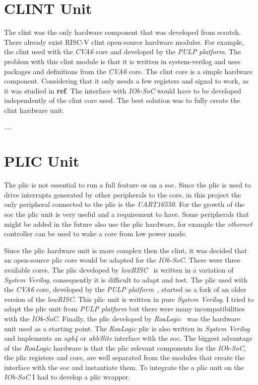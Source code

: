 \section{CLINT Unit}
The \acrshort{clint} was the only hardware component that was developed from scratch. There already exist RISC-V \acrfull{clint} open-source hardware modules. For example, the \acrshort{clint} used with the \textit{CVA6} core and developed by the \textit{PULP platform}. The problem with this \acrshort{clint} module is that it is written in system-verilog and uses packages and definitions from the \textit{CVA6} core. The \acrshort{clint} core is a simple hardware component. Considering that it only needs a few registers and signal to work, as it was studied in \textbf{ref}. The interface with \textit{IOb-SoC} would have to be developed independently of the \acrshort{clint} core used. The best solution was to fully create the \acrshort{clint} hardware unit.

....

\section{PLIC Unit}
The \acrshort{plic} is not essential to run a full feature \acrfull{os} on a \acrfull{soc}. Since the \acrshort{plic} is used to drive interrupts generated by other peripherals to the core, in this project the only peripheral connected to the \acrshort{plic} is the \textit{UART16550}. For the growth of the \acrshort{soc} the \acrshort{plic} unit is very useful and a requirement to have. Some peripherals that might be added in the future also use the \acrshort{plic} hardware, for example the \textit{ethernet} controller can be used to wake a core from low power mode. 

Since the \acrshort{plic} hardware unit is more complex then the \acrshort{clint}, it was decided that an open-source \acrshort{plic} core would be adapted for the \textit{IOb-SoC}. There were three available cores. The \acrshort{plic} developed by \textit{lowRISC}~\cite{lowrisc_plic} is written in a variation of \textit{System Verilog}, consequently it is difficult to adapt and test. The \acrshort{plic} used with the \textit{CVA6} core, developed by the \textit{PULP platform}~\cite{pulp_plic}, started as a fork of an older version of the \textit{lowRISC}. This \acrshort{plic} unit is written in pure \textit{System Verilog}. I tried to adapt the \acrshort{plic} unit from \textit{PULP platform} but there were many incompatibilities with the \textit{IOb-SoC}. Finally, the \acrshort{plic} developed by \textit{RoaLogic}~\cite{roalogic_plic} was the hardware unit used as a starting point. The \textit{RoaLogic} \acrshort{plic} is also written in \textit{System Verilog} and implements an \textit{apb4} or \textit{ahb3lite} interface with the \acrshort{soc}. The biggest advantage of the \textit{RoaLogic} hardware is that the \acrshort{plic} relevant components for the \textit{IOb-SoC}, the \acrshort{plic} registers and core, are well separated from the modules that create the interface with the \acrshort{soc} and instantiate them. To integrate the a \acrshort{plic} unit on the \textit{IOb-SoC} I had to develop a \acrshort{plic} wrapper.

